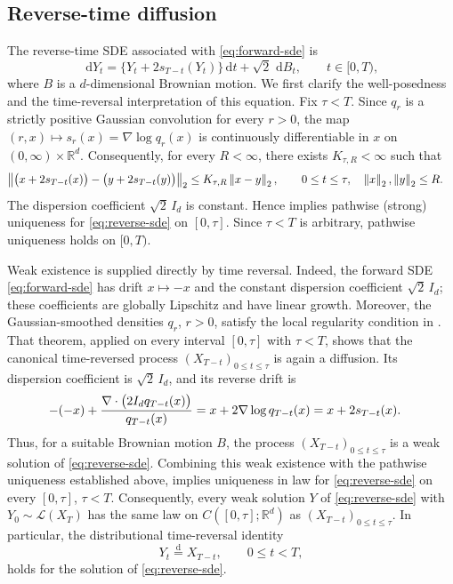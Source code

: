 \documentclass[11pt]{article}
\theoremstyle{definition}
\newcommand{\R}{\mathbb{R}}
\newcommand{\Law}{\mathcal{L}}
\newcommand{\Id}{I_d}
\newcommand{\norm}[1]{\left\lVert #1\right\rVert_2}
\newcommand{\dd}{\,\mathrm{d}}
\begin{document}
\subsection{Reverse-time diffusion}

The reverse-time SDE associated with \eqref{eq:forward-sde} is
\begin{equation}
    \dd Y_t=\bigl\{Y_t+2s_{T-t}(Y_t)\bigr\}\dd t+\sqrt{2}\,\dd B_t,
    \qquad t\in[0,T),
    \label{eq:reverse-sde}
\end{equation}
where $B$ is a $d$-dimensional Brownian motion. We first clarify the
well-posedness and the time-reversal interpretation of this equation. Fix
$\tau<T$. Since $q_r$ is a strictly positive Gaussian convolution for every
$r>0$, the map $(r,x)\mapsto s_r(x)=\nabla\log q_r(x)$ is continuously
differentiable in $x$ on $(0,\infty)\times\R^d$. Consequently, for every
$R<\infty$, there exists $K_{\tau,R}<\infty$ such that
\begin{align}
    \norm{
        \bigl(x+2s_{T-t}(x)\bigr)
        -
        \bigl(y+2s_{T-t}(y)\bigr)
    }
    &\le K_{\tau,R}\norm{x-y},
    \qquad
    0\le t\le\tau,\quad
    \norm{x},\norm{y}\le R.
    \notag
\end{align}
The dispersion coefficient $\sqrt{2}\,\Id$ is constant. Hence
\citet[Theorem~5.2.5]{karatzas1998brownian} implies pathwise
(strong) uniqueness for \eqref{eq:reverse-sde} on $[0,\tau]$. Since
$\tau<T$ is arbitrary, pathwise uniqueness holds on $[0,T)$.

Weak existence is supplied directly by time reversal. Indeed, the forward
SDE \eqref{eq:forward-sde} has drift $x\mapsto-x$ and the constant
dispersion coefficient $\sqrt{2}\,\Id$; these coefficients are globally
Lipschitz and have linear growth. Moreover, the Gaussian-smoothed
densities $q_r$, $r>0$, satisfy the local
regularity condition in \citet[Theorem~2.1]{haussmann1986time}. That theorem,
applied on every interval $[0,\tau]$ with $\tau<T$, shows that the canonical
time-reversed process $(X_{T-t})_{0\le t\le\tau}$ is again a
diffusion. Its dispersion coefficient is $\sqrt{2}\,\Id$, and its reverse
drift is
\begin{align}
    -(-x)
    +\frac{\nabla\cdot\bigl(2\Id q_{T-t}(x)\bigr)}
           {q_{T-t}(x)}
    &=
    x+2\nabla\log q_{T-t}(x)
    =
    x+2s_{T-t}(x).
    \notag
\end{align}
Thus, for a suitable Brownian motion $B$, the process
$(X_{T-t})_{0\le t\le\tau}$ is a weak solution of
\eqref{eq:reverse-sde}. Combining this weak existence with the
pathwise uniqueness established above,
\citet[Proposition~5.3.20]{karatzas1998brownian} implies uniqueness
in law for \eqref{eq:reverse-sde} on every $[0,\tau]$, $\tau<T$.
Consequently, every weak solution $Y$ of \eqref{eq:reverse-sde} with
$Y_0\sim\Law(X_T)$ has the same law on
$C([0,\tau];\R^d)$ as $(X_{T-t})_{0\le t\le\tau}$. In particular,
the distributional time-reversal identity
\begin{equation}
    Y_t\overset{\mathrm d}=X_{T-t},
    \qquad 0\le t<T,
    \label{eq:time-reversal-marginal}
\end{equation}
holds for the solution of \eqref{eq:reverse-sde}.
\end{document}
